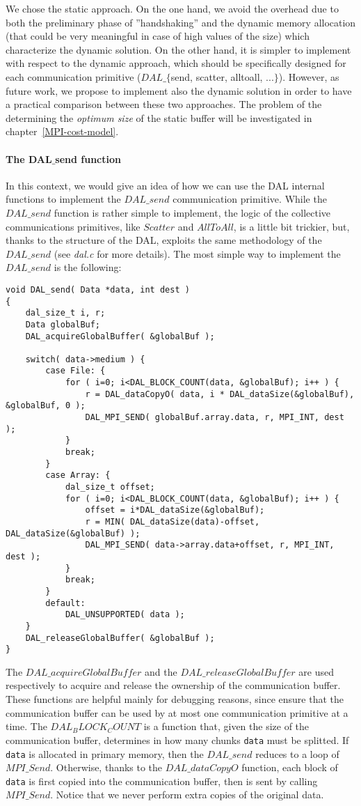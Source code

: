 We chose the static approach. On the one hand, we avoid the overhead due to both the preliminary phase of ''handshaking'' and the dynamic memory allocation (that could be very meaningful in case of high values of the size) which characterize the dynamic solution. On the other hand, it is simpler to implement with respect to the dynamic approach, which should be specifically designed for each communication primitive ($DAL\_\lbrace$send, scatter, alltoall, ...$\rbrace$). However, as future work, we propose to implement also the dynamic solution in order to have a practical comparison between these two approaches. The problem of the determining the \textit{optimum size} of the static buffer will be investigated in chapter~\ref{MPI-cost-model}.

\paragraph{The DAL$\_$send function}
In this context, we would give an idea of how we can use the DAL internal functions to implement the $DAL\_send$ communication primitive. While the $DAL\_send$ function is rather simple to implement, the logic of the collective communications primitives, like $Scatter$ and $AllToAll$, is a little bit trickier, but, thanks to the structure of the DAL, exploits the same methodology of the $DAL\_send$ (see \textit{dal.c} for more details). The most simple way to implement the $DAL\_send$ is the following:
\begin{lstlisting}
void DAL_send( Data *data, int dest )
{
	dal_size_t i, r;
	Data globalBuf;
	DAL_acquireGlobalBuffer( &globalBuf );

	switch( data->medium ) {
		case File: {
			for ( i=0; i<DAL_BLOCK_COUNT(data, &globalBuf); i++ ) {
				r = DAL_dataCopyO( data, i * DAL_dataSize(&globalBuf), &globalBuf, 0 );
				DAL_MPI_SEND( globalBuf.array.data, r, MPI_INT, dest );
			}
			break;
		}
		case Array: {
			dal_size_t offset;
			for ( i=0; i<DAL_BLOCK_COUNT(data, &globalBuf); i++ ) {
				offset = i*DAL_dataSize(&globalBuf);
				r = MIN( DAL_dataSize(data)-offset, DAL_dataSize(&globalBuf) );
				DAL_MPI_SEND( data->array.data+offset, r, MPI_INT, dest );
			}
			break;
		}
		default:
			DAL_UNSUPPORTED( data );
	}
	DAL_releaseGlobalBuffer( &globalBuf );
}
\end{lstlisting}
The $DAL\_acquireGlobalBuffer$ and the $DAL\_releaseGlobalBuffer$ are used respectively to acquire and release the ownership of the communication buffer. These functions are helpful mainly for debugging reasons, since ensure that the communication buffer can be used by at most one communication primitive at a time. The $DAL_BLOCK_COUNT$ is a function that, given the size of the communication buffer, determines in how many chunks \texttt{data} must be splitted. If \texttt{data} is allocated in primary memory, then the $DAL\_send$ reduces to a loop of $MPI\_Send$. Otherwise, thanks to the $DAL\_dataCopyO$ function, each block of \texttt{data} is first copied into the communication buffer, then is sent by calling $MPI\_Send$. Notice that we never perform extra copies of the original data.